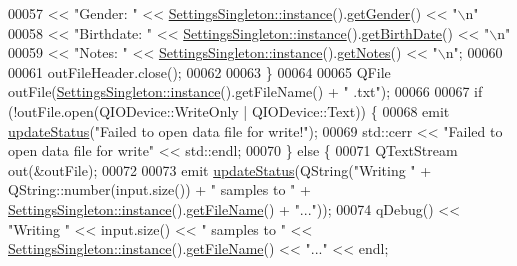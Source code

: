 \begin{DoxyCode}
00057                                 << \textcolor{stringliteral}{"Gender: "} <<            
      \hyperlink{classSettingsSingleton_aad528becd7ce5903c418a5b8b718074c}{SettingsSingleton::instance}().\hyperlink{classSettingsSingleton_a3e61e7730d97ab3e893499538aba04ba}{getGender}() << \textcolor{stringliteral}{"\(\backslash\)n"}
00058                                 << \textcolor{stringliteral}{"Birthdate: "} <<         
      \hyperlink{classSettingsSingleton_aad528becd7ce5903c418a5b8b718074c}{SettingsSingleton::instance}().\hyperlink{classSettingsSingleton_a8e25762548883f476860ed5e1ab0b366}{getBirthDate}() << \textcolor{stringliteral}{"\(\backslash\)n"}
00059                                 << \textcolor{stringliteral}{"Notes: "} <<             
      \hyperlink{classSettingsSingleton_aad528becd7ce5903c418a5b8b718074c}{SettingsSingleton::instance}().\hyperlink{classSettingsSingleton_a14e8cddfa2bfbc896b9f31bddb4e675b}{getNotes}() << \textcolor{stringliteral}{"\(\backslash\)n"};
00060 
00061                     outFileHeader.close();
00062 
00063                 \}
00064 
00065                 QFile outFile(\hyperlink{classSettingsSingleton_aad528becd7ce5903c418a5b8b718074c}{SettingsSingleton::instance}().getFileName() + \textcolor{stringliteral}{"
      .txt"});
00066 
00067                 \textcolor{keywordflow}{if} (!outFile.open(QIODevice::WriteOnly | QIODevice::Text)) \{
00068                 emit \hyperlink{classDataLogger_a59e42d6e77f7fd97ea23529abb6c275c}{updateStatus}(\textcolor{stringliteral}{"Failed to open data file for write!"});
00069                     std::cerr << \textcolor{stringliteral}{"Failed to open data file for write"} << std::endl;
00070                 \} \textcolor{keywordflow}{else} \{
00071                     QTextStream out(&outFile);
00072 
00073                 emit \hyperlink{classDataLogger_a59e42d6e77f7fd97ea23529abb6c275c}{updateStatus}(QString(\textcolor{stringliteral}{"Writing "} + QString::number(input.size()) + \textcolor{stringliteral}{"
       samples to "} + \hyperlink{classSettingsSingleton_aad528becd7ce5903c418a5b8b718074c}{SettingsSingleton::instance}().\hyperlink{classSettingsSingleton_aa5c7ee7b9966f8391d7431a7e8ab3949}{getFileName}() + \textcolor{stringliteral}{"..."}));
00074                     qDebug() << \textcolor{stringliteral}{"Writing "} << input.size() << \textcolor{stringliteral}{" samples to "} << 
      \hyperlink{classSettingsSingleton_aad528becd7ce5903c418a5b8b718074c}{SettingsSingleton::instance}().\hyperlink{classSettingsSingleton_aa5c7ee7b9966f8391d7431a7e8ab3949}{getFileName}() << \textcolor{stringliteral}{"..."} << endl;

\end{DoxyCode}
